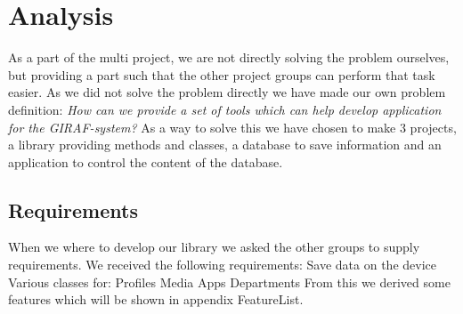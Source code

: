 \chapter{Analysis}
As a part of the multi project, we are not directly solving the problem ourselves, but providing a part such that the other project groups can perform that task easier.
As we did not solve the problem directly we have made our own problem definition:
	\textit{How can we provide a set of tools which can help develop application for the GIRAF-system?}
As a way to solve this we have chosen to make 3 projects, a library providing methods and classes, a database to save information and an application to control the content of the database. 

\section{Requirements}
When we where to develop our library we asked the other groups to supply requirements. We received the following requirements:
Save data on the device
Various classes for:
Profiles
Media
Apps
Departments
From this we derived some features which will be shown in appendix FeatureList.
